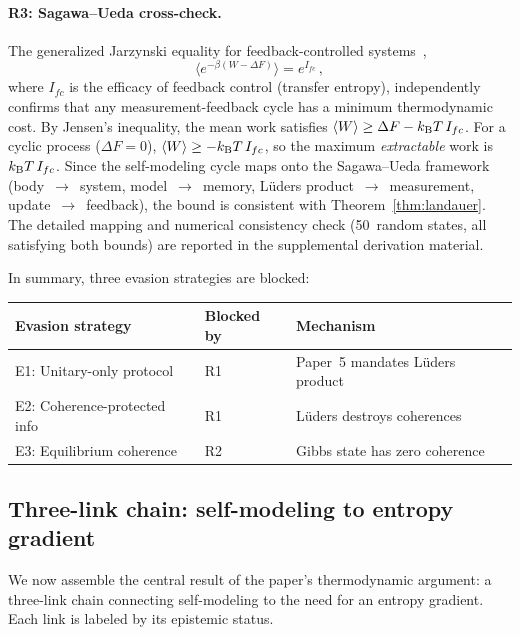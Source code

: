 \paragraph{R3: Sagawa--Ueda cross-check.}
The generalized Jarzynski equality for feedback-controlled
systems~\cite{SagawaUeda2010},
\begin{equation}
  \bigl\langle e^{-\beta(W - \Delta F)}\bigr\rangle = e^{I_{fc}} \,,
  \label{eq:sagawa-ueda}
\end{equation}
where $I_{fc}$ is the efficacy of feedback control (transfer
entropy), independently confirms that any measurement-feedback cycle
has a minimum thermodynamic cost.  By Jensen's inequality, the mean
work satisfies $\langle W \rangle \geq \Delta F - k_{\mathrm{B}} T\,I_{fc}$.
For a cyclic process ($\Delta F = 0$),
$\langle W \rangle \geq -k_{\mathrm{B}} T\,I_{fc}$, so the maximum
\emph{extractable} work is $k_{\mathrm{B}} T\,I_{fc}$.  Since the self-modeling cycle maps onto the
Sagawa--Ueda framework (body~$\to$~system, model~$\to$~memory,
Lüders product~$\to$~measurement, update~$\to$~feedback), the bound
is consistent with Theorem~\ref{thm:landauer}.  The detailed
mapping and numerical consistency check (50~random states, all
satisfying both bounds) are reported in the supplemental derivation
material.

\medskip
\noindent
In summary, three evasion strategies are blocked:
\begin{center}
\begin{tabular}{lll}
  \toprule
  Evasion strategy & Blocked by & Mechanism \\
  \midrule
  E1: Unitary-only protocol & R1 & Paper~5 mandates Lüders product \\
  E2: Coherence-protected info & R1 & Lüders destroys coherences \\
  E3: Equilibrium coherence & R2 & Gibbs state has zero coherence \\
  \bottomrule
\end{tabular}
\end{center}

\subsection{Three-link chain: self-modeling to entropy gradient}
\label{sec:chain}

We now assemble the central result of the paper's thermodynamic
argument: a three-link chain connecting self-modeling to the need for
an entropy gradient.  Each link is labeled by its epistemic status.


